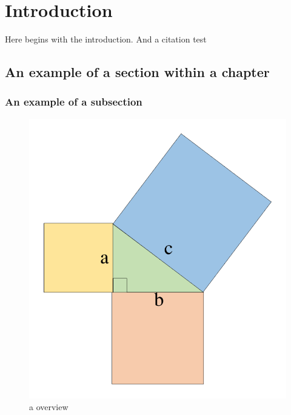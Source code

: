 \chapter{Introduction}

Here begins with the introduction. And a citation test \cite{Batley2015}

\section{An example of a section within a chapter}
\subsection{An example of a subsection}

\begin{figure}[t]
\centering
  \includegraphics[width=\columnwidth]{Figures/demo.pdf}
\caption{ a \sys overview}
\label{fig:overview}
\end{figure}

